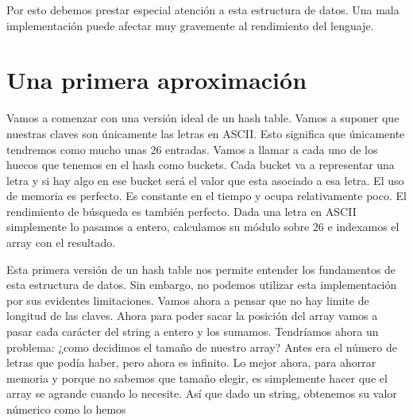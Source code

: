 Por esto debemos prestar especial atención a esta estructura de datos.  Una mala implementación puede afectar muy gravemente al rendimiento del lenguaje.

\section{Una primera aproximación}

Vamos a comenzar con una versión ideal de un hash table. Vamos a suponer que nuestras claves son únicamente las letras en ASCII.  Esto significa que únicamente tendremos como mucho unas 26 entradas. Vamos a llamar a cada uno de los huecos que tenemos en el hash como buckets.  Cada bucket va a representar una letra y si hay algo en ese bucket será el valor que esta asociado a esa letra.  El uso de memoria es perfecto.  Es constante en el tiempo y ocupa relativamente poco.  El rendimiento de búsqueda es también perfecto.  Dada una letra en ASCII simplemente lo pasamos a entero,  calculamos su módulo sobre 26 e indexamos el array con el resultado. 

Esta primera versión de un hash table nos permite entender los fundamentos de esta estructura de datos.  Sin embargo, no podemos utilizar esta implementación por sus evidentes limitaciones.  Vamos ahora a pensar que no hay limite de longitud de las claves.  Ahora para poder sacar la posición del array vamos a pasar cada carácter del string a entero y los sumamos.  Tendríamos ahora un problema: ¿como decidimos el tamaño de nuestro array? Antes era el número de letras que podía haber,  pero ahora es infinito.  Lo mejor ahora,  para ahorrar memoria y porque no sabemos que tamaño elegir,  es simplemente hacer que el array se agrande cuando lo necesite.  Así que dado un string, obtenemos su valor númerico como lo hemos 